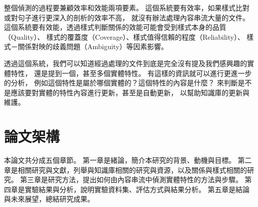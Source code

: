 整個偵測的過程要兼顧效率和效能兩項要素。
這個系統要有效率，如果樣式比對或對句子進行更深入的剖析的效率不高，
就沒有辦法處理內容串流大量的文件。
這個系統要有效能，透過樣式判斷關係的效能可能會受到樣式本身的品質（Quality）、
樣式的覆蓋度（Coverage）、樣式值得信賴的程度（Reliability）、
樣式－關係對映的歧義問題（Ambiguity）等因素影響。

透過這個系統，我們可以知道經過處理的文件到底是完全沒有提及我們感興趣的實體特性，
還是提到一個，甚至多個實體特性。
有這樣的資訊就可以進行更進一步的分析，
例如這個特性是屬於哪個實體的？這個特性的內容是什麼？
來判斷是不是應該要對實體的特性內容進行更新，甚至是自動更新，
以幫助知識庫的更新與維護。

%
%
\section{論文架構}
本論文共分成五個章節。
第一章是緒論，簡介本研究的背景、動機與目標。
第二章是相關研究與文獻，列舉與知識庫相關的研究與資源，以及關係與樣式相關的研究。
第三章是研究方法，提出如何由內容串流中偵測實體特性的方法與步驟。
第四章是實驗結果與分析，說明實驗資料集、評估方式與結果分析。
第五章是結論與未來展望，總結研究成果。
